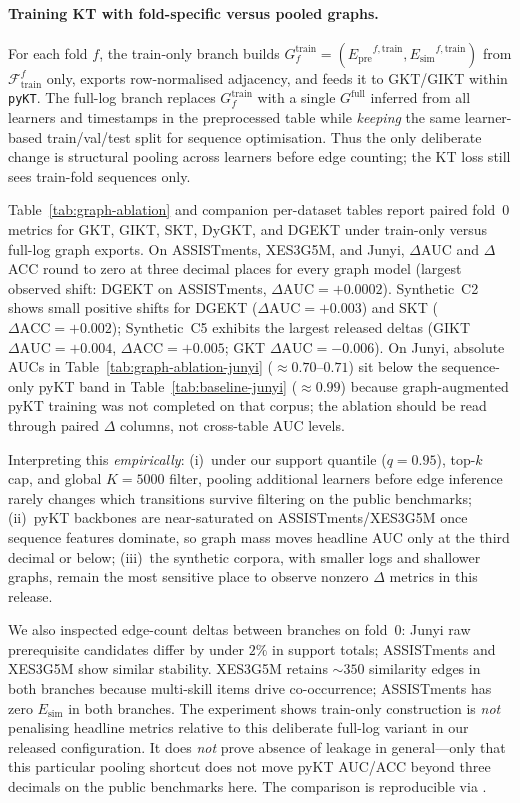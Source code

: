 \documentclass[runningheads]{llncs}
\newcommand{\Epre}{\ensuremath{E_{\text{pre}}}}
\newcommand{\Esim}{\ensuremath{E_{\text{sim}}}}
\begin{document}
\paragraph{Training KT with fold-specific versus pooled graphs.}
For each fold $f$, the train-only branch builds
$G_f^{\text{train}}=(\Epre^{f,\text{train}},\Esim^{f,\text{train}})$ from
$\mathcal{F}_{\text{train}}^f$ only, exports row-normalised adjacency, and
feeds it to GKT/GIKT within \texttt{pyKT}. The full-log branch replaces
$G_f^{\text{train}}$ with a single $G^{\text{full}}$ inferred from all
learners and timestamps in the preprocessed table while \emph{keeping} the
same learner-based train/val/test split for sequence optimisation. Thus the
only deliberate change is structural pooling across learners before edge
counting; the KT loss still sees train-fold sequences only.


Table~\ref{tab:graph-ablation} and companion per-dataset tables report
paired fold~0 metrics for GKT, GIKT, SKT, DyGKT, and DGEKT under
train-only versus full-log graph exports. On ASSISTments, XES3G5M, and
Junyi, $\Delta$AUC and $\Delta$ACC round to zero at three decimal places
for every graph model (largest observed shift: DGEKT on ASSISTments,
$\Delta\text{AUC}{=}{+}0.0002$). Synthetic~C2 shows small positive
shifts for DGEKT ($\Delta\text{AUC}{=}{+}0.003$) and SKT
($\Delta\text{ACC}{=}{+}0.002$); Synthetic~C5 exhibits the largest
released deltas (GIKT $\Delta\text{AUC}{=}{+}0.004$,
$\Delta\text{ACC}{=}{+}0.005$; GKT $\Delta\text{AUC}{=}{-}0.006$).
On Junyi, absolute AUCs in Table~\ref{tab:graph-ablation-junyi}
($\approx 0.70$--$0.71$) sit below the sequence-only pyKT band in
Table~\ref{tab:baseline-junyi} ($\approx 0.99$) because graph-augmented
pyKT training was not completed on that corpus; the ablation should be
read through paired $\Delta$ columns, not cross-table AUC levels.

Interpreting this \emph{empirically}: (i)~under our support quantile
($q{=}0.95$), top-$k$ cap, and global $K{=}5000$ filter, pooling
additional learners before edge inference rarely changes which
transitions survive filtering on the public benchmarks; (ii)~pyKT
backbones are near-saturated on ASSISTments/XES3G5M once sequence
features dominate, so graph mass moves headline AUC only at the third
decimal or below; (iii)~the synthetic corpora, with smaller logs and
shallower graphs, remain the most sensitive place to observe nonzero
$\Delta$ metrics in this release.

We also inspected edge-count deltas between branches on fold~0:
Junyi raw prerequisite candidates differ by under $2\%$ in support
totals; ASSISTments and XES3G5M show similar stability. XES3G5M retains
${\sim}350$ similarity edges in both branches because multi-skill items
drive co-occurrence; ASSISTments has zero $\Esim$ in both branches.
The experiment shows train-only construction is \emph{not} penalising
headline metrics relative to this deliberate full-log variant in our
released configuration. It does \emph{not} prove absence of leakage in
general---only that this particular pooling shortcut does not move pyKT
AUC/ACC beyond three decimals on the public benchmarks here. The
comparison is reproducible via
.
\end{document}
